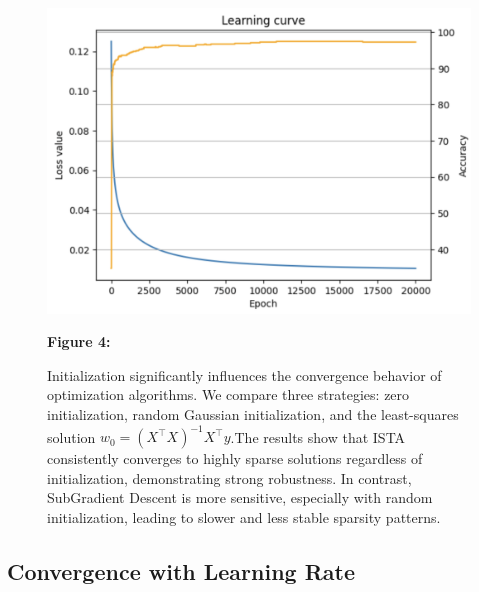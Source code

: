 \documentclass[11pt]{article}
\begin{document}
\begin{figure}[H]
    \centering
    \begin{minipage}{0.3\textwidth}
        \includegraphics[width=\linewidth]{figures/fig1.png}
    \end{minipage}
    \hfill
    \begin{minipage}{0.5\textwidth}
        \small
        \textbf{Figure 4:}

        Initialization significantly influences the convergence behavior of optimization algorithms. We compare three strategies: zero initialization, random Gaussian initialization, and the least-squares solution \( w_0 = (X^\top X)^{-1} X^\top y \).The results show that ISTA consistently converges to highly sparse solutions regardless of initialization, demonstrating strong robustness. In contrast, SubGradient Descent is more sensitive, especially with random initialization, leading to slower and less stable sparsity patterns.


    \end{minipage}
\end{figure}



\subsection{Convergence with Learning Rate}
\end{document}
